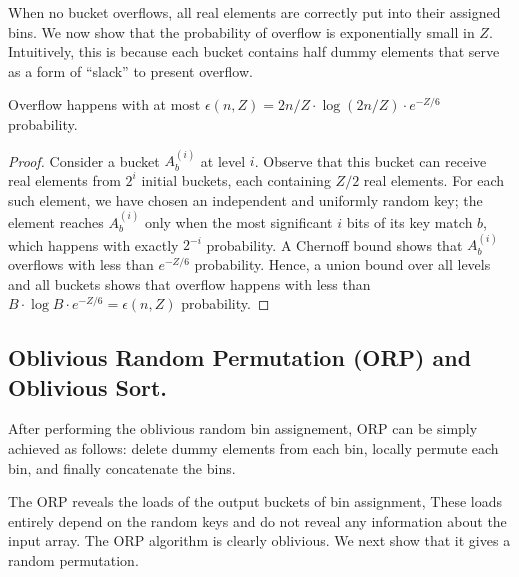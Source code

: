 When no bucket overflows, all real elements are correctly put into their assigned bins.
We now show that the probability of overflow is exponentially small in $Z$. 
Intuitively, this is because each bucket contains half dummy elements that serve as a form of ``slack'' to present overflow.

\begin{lemma}
\label{lemma:shuffle}
Overflow happens with at most $\epsilon(n, Z) = 2n/Z \cdot \log(2n/Z) \cdot e^{-Z/6}$ probability.
\end{lemma}
\begin{proof}
\label{clm:proof-shuffle}
Consider a bucket $A^{(i)}_b$ at level $i$.
Observe that this bucket can receive real elements from $2^i$ initial buckets, each containing $Z/2$ real elements.
For each such element, we have chosen an independent and uniformly random key;
the element reaches $A^{(i)}_b$ only when the most significant $i$ bits of its key match $b$,
which happens with exactly $2^{-i}$ probability.
A Chernoff bound shows that $A^{(i)}_b$ overflows with less than $e^{-Z/6}$ probability.
Hence, a union bound over all levels and all buckets 
shows that overflow happens with less than $B \cdot \log B \cdot e^{-Z/6} = \epsilon(n,Z)$ probability.
\end{proof}


\subsection{Oblivious Random Permutation (ORP) and Oblivious Sort.}
\label{sec:osort}

After performing the oblivious random bin assignement, ORP can be simply achieved as follows:
delete dummy elements from each bin, locally permute each bin, and finally concatenate the bins.

The ORP reveals the loads of the output buckets of bin assignment,
These loads entirely depend on the random keys and do not reveal any information about the input array. 
The ORP algorithm is clearly oblivious. 
We next show that it gives a random permutation.

